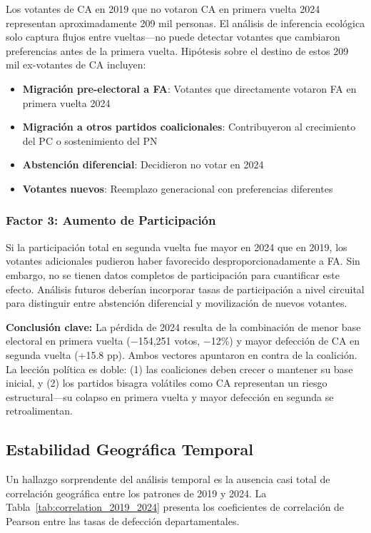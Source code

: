 Los votantes de CA en 2019 que no votaron CA en primera vuelta 2024 representan aproximadamente 209 mil personas. El análisis de inferencia ecológica solo captura flujos entre vueltas—no puede detectar votantes que cambiaron preferencias antes de la primera vuelta. Hipótesis sobre el destino de estos 209 mil ex-votantes de CA incluyen:

\begin{itemize}
    \item \textbf{Migración pre-electoral a FA}: Votantes que directamente votaron FA en primera vuelta 2024
    \item \textbf{Migración a otros partidos coalicionales}: Contribuyeron al crecimiento del PC o sostenimiento del PN
    \item \textbf{Abstención diferencial}: Decidieron no votar en 2024
    \item \textbf{Votantes nuevos}: Reemplazo generacional con preferencias diferentes
\end{itemize}

\subsubsection{Factor 3: Aumento de Participación}

Si la participación total en segunda vuelta fue mayor en 2024 que en 2019, los votantes adicionales pudieron haber favorecido desproporcionadamente a FA. Sin embargo, no se tienen datos completos de participación para cuantificar este efecto. Análisis futuros deberían incorporar tasas de participación a nivel circuital para distinguir entre abstención diferencial y movilización de nuevos votantes.

\textbf{Conclusión clave:} La pérdida de 2024 resulta de la combinación de menor base electoral en primera vuelta ($-$154{,}251 votos, $-$12\%) y mayor defección de CA en segunda vuelta (+15.8 pp). Ambos vectores apuntaron en contra de la coalición. La lección política es doble: (1) las coaliciones deben crecer o mantener su base inicial, y (2) los partidos bisagra volátiles como CA representan un riesgo estructural---su colapso en primera vuelta y mayor defección en segunda se retroalimentan.

\subsection{Estabilidad Geográfica Temporal}
\label{sec:estabilidad_geografica}

Un hallazgo sorprendente del análisis temporal es la ausencia casi total de correlación geográfica entre los patrones de 2019 y 2024. La Tabla~\ref{tab:correlation_2019_2024} presenta los coeficientes de correlación de Pearson entre las tasas de defección departamentales.


